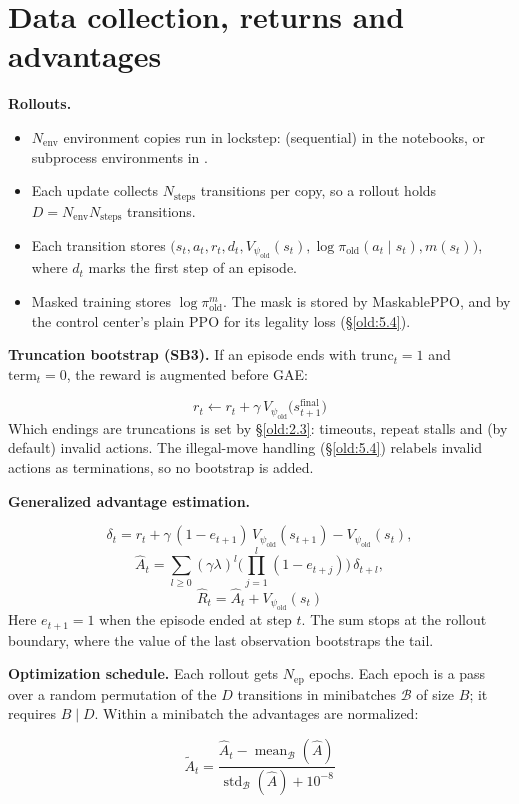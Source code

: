 \section{Data collection, returns and advantages}\label{old:4}

\textbf{Rollouts.}

\begin{itemize}
\item $N_{\text{env}}$ environment copies run in lockstep:  (sequential) in the notebooks, or subprocess environments in .
\item Each update collects $N_{\text{steps}}$ transitions per copy, so a rollout holds $D = N_{\text{env}} N_{\text{steps}}$ transitions.
\item Each transition stores $\big(s_t, a_t, r_t, d_t, V_{\psi_{\text{old}}}(s_t), \log \pi_{\text{old}}(a_t \mid s_t), m(s_t)\big)$, where $d_t$ marks the first step of an episode.
\item Masked training stores $\log \pi^m_{\text{old}}$. The mask is stored by MaskablePPO, and by the control center's plain PPO for its legality loss (\S\ref{old:5.4}).
\end{itemize}
\textbf{Truncation bootstrap (SB3).} If an episode ends with $\text{trunc}_t = 1$ and $\text{term}_t = 0$, the reward is augmented before GAE:

\[
r_t \leftarrow r_t + \gamma\, V_{\psi_{\text{old}}}\big(s^{\text{final}}_{t+1}\big)
\]
Which endings are truncations is set by \S\ref{old:2.3}: timeouts, repeat stalls and (by default) invalid actions. The  illegal-move handling (\S\ref{old:5.4}) relabels invalid actions as terminations, so no bootstrap is added.

\textbf{Generalized advantage estimation.}

\[
\delta_t = r_t + \gamma\,(1 - e_{t+1})\,V_{\psi_{\text{old}}}(s_{t+1}) - V_{\psi_{\text{old}}}(s_t),
\]
\[
\hat A_t = \sum_{l \geq 0} (\gamma\lambda)^l \Big(\prod_{j=1}^{l} (1 - e_{t+j})\Big)\,\delta_{t+l},
\]
\[
\hat R_t = \hat A_t + V_{\psi_{\text{old}}}(s_t)
\]
Here $e_{t+1} = 1$ when the episode ended at step $t$. The sum stops at the rollout boundary, where the value of the last observation bootstraps the tail.

\textbf{Optimization schedule.} Each rollout gets $N_{\text{ep}}$ epochs. Each epoch is a pass over a random permutation of the $D$ transitions in minibatches $\mathcal{B}$ of size $B$; it requires $B \mid D$. Within a minibatch the advantages are normalized:

\[
\tilde A_t = \frac{\hat A_t - \operatorname{mean}_{\mathcal{B}}(\hat A)}{\operatorname{std}_{\mathcal{B}}(\hat A) + 10^{-8}}
\]
